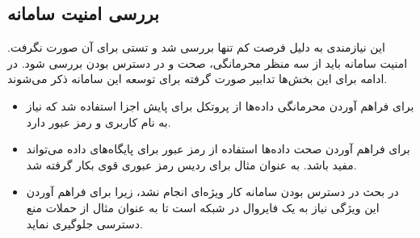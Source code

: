 \cleardoublepage

\subsection{بررسی امنیت سامانه }

این نیازمندی به دلیل فرصت کم تنها بررسی شد و تستی برای آن صورت نگرفت. امنیت سامانه باید از سه منظر محرمانگی، صحت و در دسترس بودن بررسی شود. در ادامه برای این بخش‌ها تدابیر صورت گرفته برای توسعه این سامانه ذکر می‌شوند.

\begin{itemize}
    \item برای فراهم آوردن محرمانگی داده‌ها از پروتکل  برای پایش اجزا استفاده شد که نیاز به نام کاربری و رمز عبور دارد.
    \item برای فراهم آوردن صحت داده‌ها استفاده از رمز عبور برای پایگاه‌های داده می‌تواند مفید باشد. به عنوان مثال برای ردیس رمز عبوری قوی بکار گرفته شد.
    \item در بحث در دسترس بودن سامانه کار ویژه‌ای انجام نشد، زیرا برای فراهم آوردن این ویژگی نیاز به یک فایروال در شبکه است تا به عنوان مثال از حملات منع دسترسی جلوگیری نماید. 
\end{itemize}